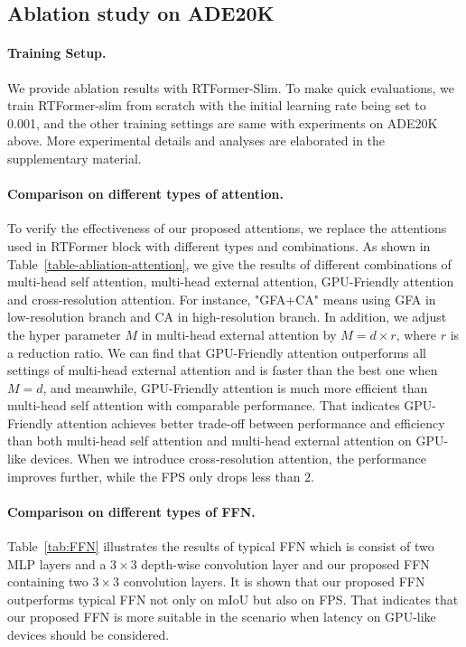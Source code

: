 \documentclass{article}
\begin{document}
\subsection{Ablation study on ADE20K}

\paragraph{Training Setup.} We provide ablation results with RTFormer-Slim. To make quick evaluations, we train RTFormer-slim from scratch with the initial learning rate being set to 0.001, and the other training settings are same with experiments on ADE20K\cite{ADE20K} above. More experimental details and analyses are elaborated in the supplementary material.

\vspace{-2mm}
\paragraph{Comparison on different types of attention.}
To verify the effectiveness of our proposed attentions, we replace the attentions used in RTFormer block with different types and combinations. As shown in Table~\ref{table-abliation-attention}, we give the results of different combinations of multi-head self attention, multi-head external attention, GPU-Friendly attention and cross-resolution attention. For instance, "GFA+CA" means using GFA in low-resolution branch and CA in high-resolution branch. In addition, we adjust the hyper parameter $M$ in multi-head external attention by $M = d\times r$, where $r$ is a reduction ratio. We can find that GPU-Friendly attention outperforms all settings of multi-head external attention and is faster than the best one when $M = d$, and meanwhile, GPU-Friendly attention is much more efficient than multi-head self attention with comparable performance. That indicates GPU-Friendly attention achieves better trade-off between performance and efficiency than both multi-head self attention and multi-head external attention on GPU-like devices. When we introduce cross-resolution attention, the performance improves further, while the FPS only drops less than $2$.

\vspace{-2mm}
\paragraph{Comparison on different types of FFN.}
Table~\ref{tab:FFN} illustrates the results of typical FFN which is consist of two MLP layers and a $3\times3$ depth-wise convolution layer and our proposed FFN containing two $3\times 3$ convolution layers. It is shown that our proposed FFN outperforms typical FFN not only on mIoU but also on FPS. That indicates that our proposed FFN is more suitable in the scenario when latency on GPU-like devices should be considered.
\end{document}
